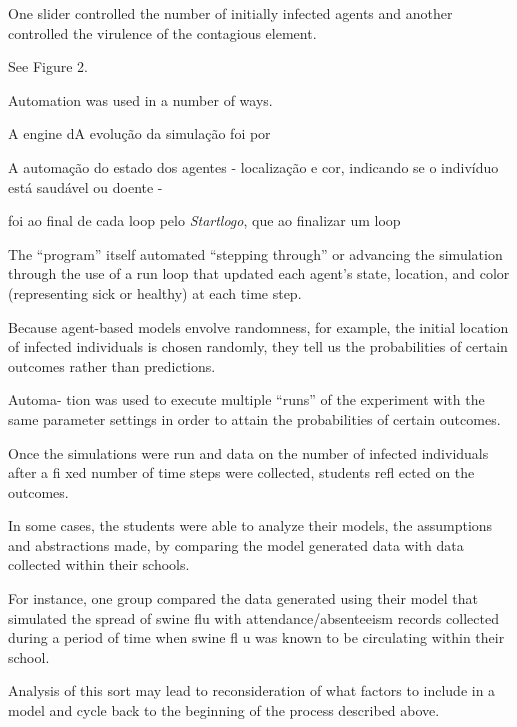 One slider controlled the number of initially infected agents and another controlled the virulence of the contagious element.

See Figure 2.

Automation was used in a number of ways.

 

A engine dA evolução da simulação foi  por 

A automação do estado dos agentes - localização e cor, indicando se o indivíduo está saudável ou doente - 




foi ao final de cada loop pelo \textit{Startlogo}, que ao finalizar um loop 



The “program” itself automated “stepping through” or advancing the simulation through the use of a run loop that updated each agent’s state, location, and color (representing sick or healthy) at each time step.

Because agent-based models envolve randomness, for example, the initial location of infected individuals is chosen randomly, they tell us the probabilities of certain outcomes rather than predictions.

Automa- tion was used to execute multiple “runs” of the experiment with the same parameter settings in order to attain the probabilities of certain outcomes.

Once the simulations were run and data on the number of infected individuals after a fi xed number of time steps were collected, students refl ected on the outcomes.

In some cases, the students were able to analyze their models, the assumptions and abstractions made, by comparing the model generated data with data collected within their schools.

For instance, one group compared the data generated using their model that simulated the spread of swine flu with attendance/absenteeism records collected during a period of time when swine fl u was known to be circulating within their school.

Analysis of this sort may lead to reconsideration of what factors to include in a model and cycle back to the beginning of the process described above.

